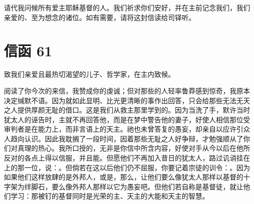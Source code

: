 请代我问候所有爱主耶稣基督的人。我们祈求你们安好，并在主前记念我们，我们亲爱的、至为想念的诸位。如有需要，请将这封信读给司铎听。\par



\section{信函 61}

\par

致我们亲爱且最热切渴望的儿子、哲学家，在主内致候。\par

阅读了你今次的来信，我赞成你的虔诚；但对那些的人轻率鲁莽感到惊奇，我原本决定缄默不语。因为就如此显明、比光更清晰的事作出回答，只会给那些无法无天之人提供厚颜无耻的借口。这是我们从救主那里学到的。因为当洗了手，默许当时犹太人的诬告时，主就不再回答他，而是在梦中警告他的妻子，好使人相信那位受审判者是在能力上，而非言语上的天主。祂也未曾答复的愚妄，却亲自以应许引众人趋向认识。因此我耽搁了一段时间，因着那些无耻之人好争辩，才勉强顺从了你们对真理的热心。我所口授的，无非是你信中所含内容，好使对手从今以后在他所反对的各点上得以信服，并且能。但愿他们不再加入昔日的犹太人，路过讥诮挂在上的那一位，说：。但倘若在这以后他们仍不屈服，你要记着宗徒的训令：。因为如果他们这样放肆的是外邦人，或是，那么，让他们要么像犹太人那样以基督的十字架为绊脚石，要么像外邦人那样以它为愚妄吧。但他们若自称是基督徒，就让他们学习：那被钉的基督同时是光荣的主、天主的大能和天主的智慧。\par

